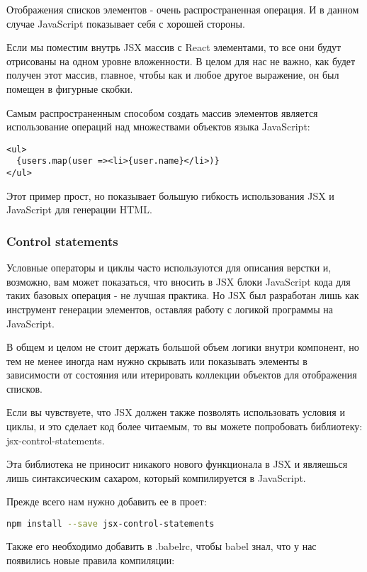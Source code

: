 Отображения списков элементов - очень распространенная операция. И в данном случае JavaScript показывает себя с хорошей стороны.

Если мы поместим внутрь JSX массив с React элементами, то все они будут отрисованы на одном уровне вложенности. В целом для нас не важно, как будет получен этот массив, главное, чтобы как и любое другое выражение, он был помещен в фигурные скобки.

Самым распространенным способом создать массив элементов является использование операций над множествами объектов языка JavaScript:

\begin{lstlisting}
<ul>
  {users.map(user =><li>{user.name}</li>)}
</ul>
\end{lstlisting}

Этот пример прост, но показывает большую гибкость использования JSX и JavaScript для генерации HTML.

\subsubsection{Control statements}

Условные операторы и циклы часто используются для описания верстки и, возможно, вам может показаться, что вносить в JSX блоки JavaScript кода для таких базовых операция - не лучшая практика. Но JSX был разработан лишь как инструмент генерации элементов, оставляя работу с логикой программы на JavaScript.

В общем и целом не стоит держать большой объем логики внутри компонент, но тем не менее иногда нам нужно скрывать или показывать элементы в зависимости от состояния или итерировать коллекции объектов для отображения списков. 

Если вы чувствуете, что JSX должен также позволять использовать условия и циклы, и это сделает код более читаемым, то вы можете попробовать библиотеку: jsx-control-statements.

Эта библиотека не приносит никакого нового функционала в JSX и являешься лишь синтаксическим сахаром, который компилируется в JavaScript.

Прежде всего нам нужно добавить ее в проет:

\begin{lstlisting}[language=bash]
npm install --save jsx-control-statements
\end{lstlisting}

Также его необходимо добавить в .babelrc, чтобы babel знал, что у нас появились новые правила компиляции:

